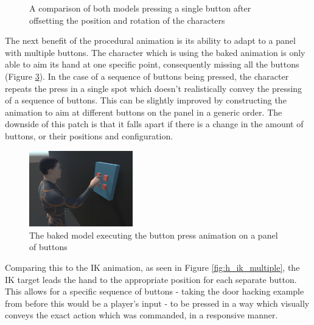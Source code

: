 \begin{figure}[h!]
\begin{subfigure}{0.4\textwidth}
        \label{fig:h_ik_offset}
    \end{subfigure}
    \caption{A comparison of both models pressing a single button after
    offsetting the position and rotation of the characters}
    \label{fig:h_offset}
\end{figure}

The next benefit of the procedural animation is its ability to adapt to a panel
with multiple buttons. The character which is using the baked animation is only
able to aim its hand at one specific point, consequently missing all the buttons
(Figure \ref{fig:h_b_multiple}). In the case of a sequence of buttons being
pressed, the character repeats the press in a single spot which doesn't
realistically convey the pressing of a sequence of buttons. This can be slightly
improved by constructing the animation to aim at different buttons on the panel
in a generic order. The downside of this patch is that it falls apart if there
is a change in the amount of buttons, or their positions and configuration. 

\begin{figure}[h!]
    \centering
    \captionsetup{justification=centering}
    \includegraphics[width=0.4\textwidth]{grafika/h_b_multiple.png}
    \caption{The baked model executing the button press animation on a panel of
    buttons}
    \label{fig:h_b_multiple}
\end{figure}

Comparing this to the IK animation, as seen in Figure \ref{fig:h_ik_multiple},
the IK target leads the hand to the appropriate position for each separate
button. This allows for a specific sequence of buttons - taking the door hacking
example from before this would be a player's input - to be pressed in a way
which visually conveys the exact action which was commanded, in a responsive
manner.

